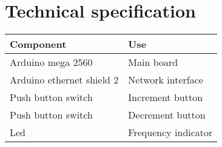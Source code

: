\chapter{Technical specification}

\begin{center}
    \begin{tabularx}{\textwidth}{||X l||} 
 \hline
 Component & Use \\ [0.5ex] 
 \hline
 Arduino mega 2560 & Main board \\
 \hline
 Arduino ethernet shield 2 & Network interface \\
 \hline\hline
 Push button switch & Increment button \\ 
 \hline
 Push button switch & Decrement button \\ 
 \hline
 Led & Frequency indicator \\
 \hline
\end{tabularx}
\end{center}
